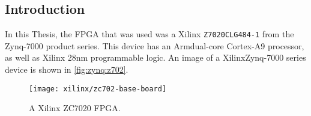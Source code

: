 \subsection{Introduction}
\label{zynq:introduction}
\nocite{Zynq7000:ProductBrief,Zynq7000:UserGuide}
In this Thesis, the \gls{FPGA} that was used was a Xilinx\textregistered
\verb+Z7020CLG484-1+ from the Zynq-7000 product series. This device has an
Arm\textregistered dual-core Cortex\texttrademark-A9 processor, as well as
Xilinx 28nm programmable logic. An image of a Xilinx\textregistered Zynq-7000
series device is shown in \autoref{fig:zynq:z702}.

\begin{figure}
    \centering
    \texttt{[image: xilinx/zc702-base-board]}
    \caption{A Xilinx ZC7020 \gls{FPGA}.}
    \label{fig:zynq:zc702}
\end{figure}

